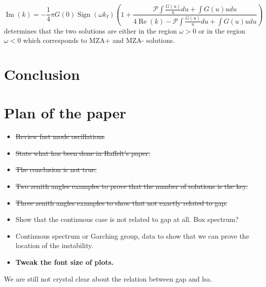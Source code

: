 \documentclass[%
preprint,
 amsmath,amssymb,
 aps,
 prd
]{revtex4-1}
\begin{document}
\begin{equation}
   \operatorname{Im}(k) = - \frac{1}{4} \pi G(0) \operatorname{Sign}(\omega k_I) \left(  1 + \frac{ \mathscr P \int \frac{G(u)}{u} du + \int G(u) u du }{ 4 \operatorname{Re}(k) - \mathscr P \int \frac{G(u)}{u} du + \int G(u) u du }  \right)
\end{equation}
determines that the two solutions are either in the region $\omega>0$ or in the region $\omega<0$ which corresponds to MZA+ and MZA- solutions.



\section{\label{sec-conclusion}Conclusion}























\appendix
\section{\label{sec-outline}Plan of the paper}



\begin{itemize}
    \item \sout{Review fast mode oscillations}
    \item \sout{State what has been done in Raffelt's paper.}
    \item \sout{The conclusion is not true.}
    \item \sout{Two zenith angles examples to prove that the number of solutions is the key.}
    \item \sout{Three zenith angles examples to show that not exactly related to gap.}
    \item Show that the continuous case is not related to gap at all. Box spectrum?
    \item Continuous spectrum or Garching group, data to show that we can prove the location of the instability.
    \item {\color{red}\bf Tweak the font size of plots.}
\end{itemize}



We are still not crystal clear about the relation between gap and lsa.







\end{document}
